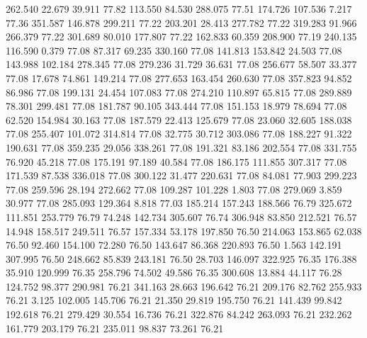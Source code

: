  262.540   22.679   39.911        77.82
 113.550   84.530  288.075        77.51
 174.726  107.536    7.217        77.36
 351.587  146.878  299.211        77.22
 203.201   28.413  277.782        77.22
 319.283   91.966  266.379        77.22
 301.689   80.010  177.807        77.22
 162.833   60.359  208.900        77.19
 240.135  116.590    0.379        77.08
  87.317   69.235  330.160        77.08
 141.813  153.842   24.503        77.08
 143.988  102.184  278.345        77.08
 279.236   31.729   36.631        77.08
 256.677   58.507   33.377        77.08
  17.678   74.861  149.214        77.08
 277.653  163.454  260.630        77.08
 357.823   94.852   86.986        77.08
 199.131   24.454  107.083        77.08
 274.210  110.897   65.815        77.08
 289.889   78.301  299.481        77.08
 181.787   90.105  343.444        77.08
 151.153   18.979   78.694        77.08
  62.520  154.984   30.163        77.08
 187.579   22.413  125.679        77.08
  23.060   32.605  188.038        77.08
 255.407  101.072  314.814        77.08
  32.775   30.712  303.086        77.08
 188.227   91.322  190.631        77.08
 359.235   29.056  338.261        77.08
 191.321   83.186  202.554        77.08
 331.755   76.920   45.218        77.08
 175.191   97.189   40.584        77.08
 186.175  111.855  307.317        77.08
 171.539   87.538  336.018        77.08
 300.122   31.477  220.631        77.08
  84.081   77.903  299.223        77.08
 259.596   28.194  272.662        77.08
 109.287  101.228    1.803        77.08
 279.069    3.859   30.977        77.08
 285.093  129.364    8.818        77.03
 185.214  157.243  188.566        76.79
 325.672  111.851  253.779        76.79
  74.248  142.734  305.607        76.74
 306.948   83.850  212.521        76.57
  14.948  158.517  249.511        76.57
 157.334   53.178  197.850        76.50
 214.063  153.865   62.038        76.50
  92.460  154.100   72.280        76.50
 143.647   86.368  220.893        76.50
   1.563  142.191  307.995        76.50
 248.662   85.839  243.181        76.50
  28.703  146.097  322.925        76.35
 176.388   35.910  120.999        76.35
 258.796   74.502   49.586        76.35
 300.608   13.884   44.117        76.28
 124.752   98.377  290.981        76.21
 341.163   28.663  196.642        76.21
 209.176   82.762  255.933        76.21
   3.125  102.005  145.706        76.21
  21.350   29.819  195.750        76.21
 141.439   99.842  192.618        76.21
 279.429   30.554   16.736        76.21
 322.876   84.242  263.093        76.21
 232.262  161.779  203.179        76.21
 235.011   98.837   73.261        76.21

